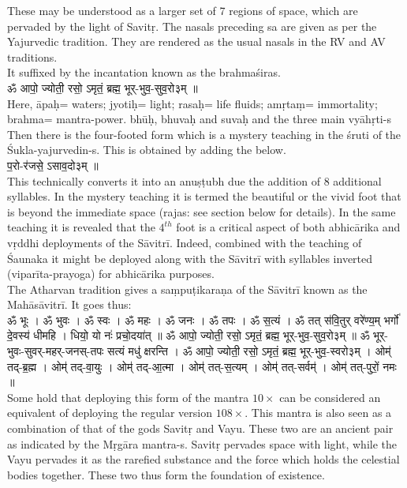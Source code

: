 \documentclass[12pt]{article}
\begin{document}
These may be understood as a larger set of 7 regions of space, which are pervaded by the light of Savitṛ. The nasals preceding sa are given as per the Yajurvedic tradition. They are rendered as the usual nasals in the RV and AV traditions.\\[10pt]
It suffixed by the incantation known as the brahmaśiras.\\
{\skt ॐ आपो॒ ज्योती॒ रसो॒ ऽमृतं॒ ब्रह्म॒ भूर्-भुव॒-सुव॒रो३म् ॥
}\\
Here, āpaḥ= waters; jyotiḥ= light; rasaḥ= life fluids; amṛtaṃ= immortality; brahma= mantra-power. bhūḥ, bhuvaḥ and suvaḥ and the three main vyāhṛti-s \\[10pt]
Then there is the four-footed form which is a mystery teaching in the śruti of the Śukla-yajurvedin-s. This is obtained by adding the below.\\
{\skt प॒रो-र॑जसे॒ ऽसाव॒दो३म् ॥
}\\
This technically converts it into an anuṣṭubh due the addition of 8 additional syllables. In the mystery teaching it is termed the beautiful or the vivid foot that is beyond the immediate space (rajas: see section below for details). In the same teaching it is revealed that the $4^{th}$ foot is a critical aspect of both abhicārika and vṛddhi deployments of the Sāvitrī. Indeed, combined with the teaching of Śaunaka it might be deployed along with the Sāvitrī with syllables inverted (viparīta-prayoga) for abhicārika purposes.\\[10pt]
The Atharvan tradition gives a saṃpuṭikaraṇa of the Sāvitrī known as the Mahāsāvitrī. It goes thus:\\[8pt]
{\skt 
ॐ भूः । ॐ भुवः । ॐ स्वः । ॐ महः । ॐ जनः । ॐ तपः । ॐ स॒त्यं । ॐ तत् स॑वि॒तुर् वरे॑ण्य॒म् भर्गो॑ दे॒वस्य॑ धीमहि । धियो॒ यो नः॑ प्रचो॒दया॑त् ॥ ॐ आपो॒ ज्योती॒ रसो॒ ऽमृतं॒ ब्रह्म॒ भूर्-भुव॒-सुव॒रो३म् ॥ ॐ भूर्-भुवः-सुवर्-महर्-जनस्-तपः सत्यं मधु॑ क्षरन्ति । ॐ आपो॒ ज्योती॒ रसो॒ ऽमृतं॒ ब्रह्म॒ भूर्-भुव॒-स्वरो३म् । ओम्॑ तद्-ब्र॒ह्म । ओम्॑ तद्-वा॒युः । ओम्॑ तद्-आ॒त्मा । ओम्॑ तत्-स॒त्यम् । ओम्॑ तत्-सर्वम्॑ । ओम्॑ तत्-पुरों॒ नमः ॥
}\\[8pt]
Some hold that deploying this form of the mantra $10 \times$ can be considered an equivalent of deploying the regular version $108 \times$. This mantra is also seen as a combination of that of the gods Savitṛ and Vayu. These two are an ancient pair as indicated by the Mṛgāra mantra-s. Savitṛ pervades space with light, while the Vayu pervades it as the rarefied substance and the force which holds the celestial bodies together. These two thus form the foundation of existence.\\[10pt]
\end{document}
